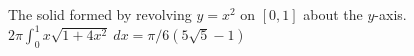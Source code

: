 {The solid formed by revolving $y=x^2$ on $[0,1]$ about the $y$-axis.}
{$2\pi\int_0^1 x\sqrt{1+4x^2}\ dx = \pi/6(5\sqrt{5}-1)$}
